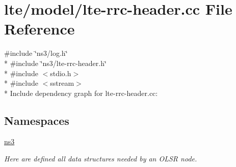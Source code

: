 \hypertarget{lte-rrc-header_8cc}{}\section{lte/model/lte-\/rrc-\/header.cc File Reference}
\label{lte-rrc-header_8cc}
{\ttfamily \#include \char`\"{}ns3/log.\+h\char`\"{}}\\*
{\ttfamily \#include \char`\"{}ns3/lte-\/rrc-\/header.\+h\char`\"{}}\\*
{\ttfamily \#include $<$stdio.\+h$>$}\\*
{\ttfamily \#include $<$sstream$>$}\\*
Include dependency graph for lte-\/rrc-\/header.cc\+:
\subsection*{Namespaces}
\begin{DoxyCompactItemize}
\item 
 \hyperlink{namespacens3}{ns3}
\begin{DoxyCompactList}\small\item\em Here are defined all data structures needed by an O\+L\+SR node. \end{DoxyCompactList}\end{DoxyCompactItemize}
